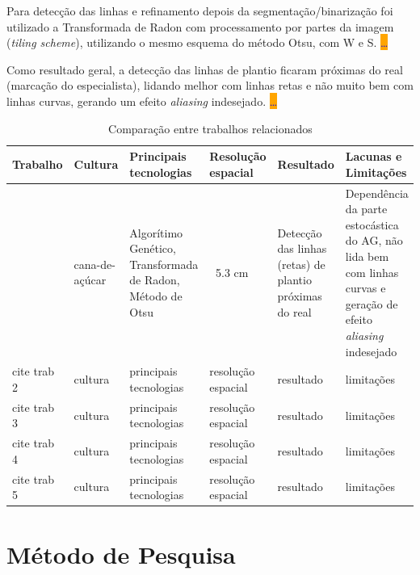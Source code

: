 \documentclass[12pt, a4paper, english, brazil]{article}
\newcommand{\dotsBlue}{\colorbox{orange}{\textcolor{blue}{\dots}}}
\begin{document}
Para detecção das linhas e refinamento depois da segmentação/binarização foi utilizado a Transformada de Radon com processamento por partes da imagem (\textit{tiling scheme}), utilizando o mesmo esquema do método Otsu, com W e S. \dotsBlue

Como resultado geral, a detecção das linhas de plantio ficaram próximas do real (marcação do especialista), lidando melhor com linhas retas e não muito bem com linhas curvas, gerando um efeito \textit{aliasing} indesejado. \dotsBlue

\begin{landscape}
\begin{table}
\centering
\caption{Comparação entre trabalhos relacionados}
\label{tab:trab_rela}
\begin{tabularx}{\linewidth}{|L|L|L|L|L|L|} 
\hline
\textbf{Trabalho} & \textbf{Cultura} & \textbf{Principais tecnologias} & \textbf{Resolução espacial} & \textbf{Resultado} & \textbf{Lacunas e Limitações} \\ \hline
\cite{Silva_Escarpinati_Backes_2021} & cana-de-açúcar & Algorítimo Genético, Transformada de Radon, Método de Otsu & $~$ 5.3 cm & Detecção das linhas (retas) de plantio próximas do real & Dependência da parte estocástica do AG, não lida bem com linhas curvas e geração de efeito \textit{aliasing} indesejado \\ \hline
cite trab 2 & cultura & principais tecnologias & resolução espacial & resultado & limitações \\ \hline
cite trab 3 & cultura & principais tecnologias & resolução espacial & resultado & limitações \\ \hline
cite trab 4 & cultura & principais tecnologias & resolução espacial & resultado & limitações \\ \hline
cite trab 5 & cultura & principais tecnologias & resolução espacial & resultado & limitações \\ \hline
\end{tabularx}
\end{table}
\end{landscape}

\section{Método de Pesquisa}
\end{document}
